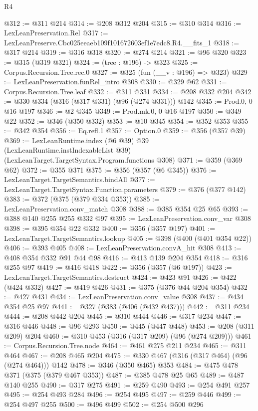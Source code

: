 \begin{lexlean}{R4}
\begin{coremodule}
@312 := @311 @214
@314 := @208 @312 @204
@315 := @310 @314
@316 := LexLeanPreservation.Rel
@317 := LexLeanPreserve.Cbc025eeaeb109f101672603ef1e7edc8.R4.__fits_1
@318 := @317 @214
@319 := @316 @318
@320 := @274 @214
@321 := @96 @320
@323 := @315 (@319 @321)
@324 := (tree : @196) -> @323
@325 := Corpus.Recursion.Tree.rec.{0}
@327 := @325 (fun (__v : @196) => @323)
@329 := LexLeanPreservation.funRel_intro @308
@330 := @329 @62
@331 := Corpus.Recursion.Tree.leaf
@332 := @311 @331
@334 := @208 @332 @204
@342 := @330 @334 (@316 (@317 @331) (@96 (@274 @331))) @142
@345 := Prod.{0, 0} @16 @197
@346 := @2 @345
@349 := Prod.mk.{0, 0} @16 @197
@350 := @349 @22
@352 := @346 (@350 @332)
@353 := @10 @345
@354 := @352 @353
@355 := @342 @354
@356 := Eq.refl.{1}
@357 := Option.{0}
@359 := @356 (@357 @39)
@369 := LexLeanRuntime.index
    (@6 @39)
    @39
    (LexLeanRuntime.instIndexableList @39)
    (LexLeanTarget.TargetSyntax.Program.functions @308)
@371 := @359 (@369 @62)
@372 := @355 @371
@375 := @356 (@357 (@6 @345))
@376 := LexLeanTarget.TargetSemantics.bindAll
@377 := LexLeanTarget.TargetSyntax.Function.parameters
@379 := @376 (@377 @142)
@383 := @372 (@375 (@379 @334 @353))
@385 := LexLeanPreservation.conv_match @308
@388 := @385 @354 @25 @65
@393 := @388 @140 @255 @255 @332 @97
@395 := LexLeanPreservation.conv_var @308
@398 := @395 @354 @22 @332
@400 := @356 (@357 @197)
@401 := LexLeanTarget.TargetSemantics.lookup
@405 := @398 (@400 (@401 @354 @22))
@406 := @393 @405
@408 := LexLeanPreservation.convA_hit @308
@413 := @408 @354 @332 @91 @44 @98
@416 := @413 @139 @204 @354
@418 := @316 @255 @97
@419 := @416 @418
@422 := @356 (@357 (@6 @197))
@423 := LexLeanTarget.TargetSemantics.destruct
@424 := @423 @91
@426 := @422 (@424 @332)
@427 := @419 @426
@431 := @375 (@376 @44 @204 @354)
@432 := @427 @431
@434 := LexLeanPreservation.conv_value @308
@437 := @434 @354 @25 @97
@441 := @327 (@383 (@406 (@432 @437)))
@442 := @311 @234
@444 := @208 @442 @204
@445 := @310 @444
@446 := @317 @234
@447 := @316 @446
@448 := @96 @293
@450 := @445 (@447 @448)
@453 := @208 (@311 @209) @204
@460 := @310 @453 (@316 (@317 @209) (@96 (@274 @209)))
@461 := Corpus.Recursion.Tree.node
@464 := @461 @275 @211 @234
@465 := @311 @464
@467 := @208 @465 @204
@475 := @330 @467 (@316 (@317 @464) (@96 (@274 @464))) @142
@478 := @346 (@350 @465) @353
@484 := @475 @478 @371 (@375 (@379 @467 @353))
@487 := @385 @478 @25 @65
@489 := @487 @140 @255
@490 := @317 @275
@491 := @259 @490
@493 := @254 @491 @257
@495 := @254 @493 @284
@496 := @254 @495
@497 := @259 @446
@499 := @254 @497 @255
@500 := @496 @499
@502 := @254 @500 @296

\end{coremodule}
\end{lexlean}
